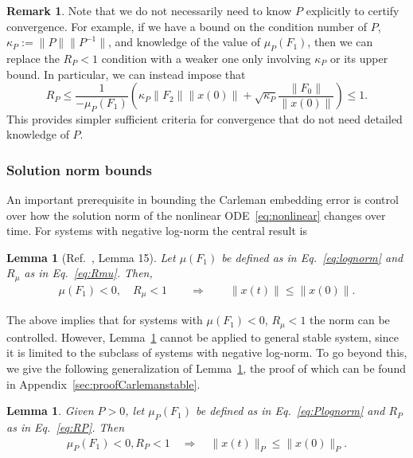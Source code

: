 \documentclass[superscriptaddress,onecolumn,nofootinbib,longbibliography,a4paper,accepted=2026-09-29]{quantumarticle}
\theoremstyle{plain}
\newtheorem{lemma}[thm]{Lemma}
\theoremstyle{definition}
\newtheorem{rmk}[thm]{Remark}
\numberwithin{thm}{section}
\numberwithin{assumption}{section}
\numberwithin{lemma}{section}
\numberwithin{prop}{section}
\numberwithin{cor}{section}
\numberwithin{definition}{section}
\numberwithin{rmk}{section}
\numberwithin{equation}{section}
\begin{document}
\begin{rmk}
\label{rmk:knowingPmatrix}
Note that we do not necessarily need to know $P$ explicitly to certify convergence. For example, if we have a bound on the condition number of $P$, $\kappa_P := \| P\| \| P^{-1}\|$, and knowledge of the value of $\mu_P(F_1)$, then we can replace the $R_P <1$ condition with a weaker one only involving $\kappa_P$ or its upper bound. In particular, we can instead impose that
\begin{equation}
    R_P \le \frac{1}{-\mu_P(F_1)} \left( \kappa_P \|F_2\| \|x(0)\| + \sqrt{\kappa_P} \frac{\|F_0\|}{\|x(0)\|} \right ) \le  1.
\end{equation}
This provides simpler sufficient criteria for convergence that do not need detailed knowledge of $P$.
\end{rmk}


\subsubsection*{Solution norm bounds}

An important prerequisite in bounding the Carleman embedding error is control over how the solution norm of the nonlinear ODE~\eqref{eq:nonlinear} changes over time. For systems with negative log-norm the central result is 
\begin{lemma}[Ref.~\cite{krovi2023improved}, Lemma 15]
\label{lem:normdecrease}
Let $\mu(F_1)$ be defined as in Eq.~\eqref{eq:lognorm} and $R_\mu$ as in Eq.~\eqref{eq:Rmu}. Then,
\begin{align}
  \mu(F_1)<0,  \quad  R_\mu<1 \quad \quad \Rightarrow \quad  \quad \|x(t)\| \le \|x(0)\|.
\end{align}
\end{lemma}
The above implies that for systems with $\mu(F_1)<0$, $R_\mu<1$ the norm can be controlled. However, Lemma~\ref{lem:normdecrease} cannot be applied to general stable system, since it is limited to the subclass of systems with negative log-norm. To go beyond this, we give the following generalization of Lemma~\ref{lem:normdecrease}, the proof of which can be found in Appendix~\ref{sec:proofCarlemanstable}.
\begin{lemma}
\label{lem:normdecreasegeneral}
Given $P>0$, let $\mu_P(F_1)$ be defined as in Eq.~\eqref{eq:Plognorm} and $R_P$ as in Eq.~\eqref{eq:RP}. Then
\begin{align}
\label{eq:solutionormbound}
  \mu_P(F_1)<0,  R_P<1 \quad  \Rightarrow \quad \|x(t)\|_P \le \|x(0)\|_P.
\end{align}
\end{lemma}
\end{document}
